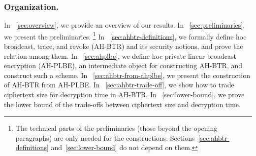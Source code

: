 \subsubsection{Organization.}
In \Section~\ref{sec:overview}, we provide an overview of our results.
In \Section~\ref{sec:preliminaries}, we present the preliminaries.%
\footnote{The technical parts of the preliminaries (those beyond the opening paragraphs) are only needed for the constructions.
Sections~\ref{sec:ahbtr-definitions} and~\ref{sec:lower-bound} do not depend on them.}
In \Section~\ref{sec:ahbtr-definitions}, we formally define \ad hoc broadcast, trace, and revoke (AH-BTR) and its security notions, and prove the relation among them.
In \Section~\ref{sec:ahplbe}, we define \ad hoc private linear broadcast encryption (AH-PLBE), an intermediate object for constructing AH-BTR, and construct such a scheme.
In \Section~\ref{sec:ahbtr-from-ahplbe}, we present the construction of AH-BTR from AH-PLBE.
In \Section~\ref{sec:ahbtr-trade-off}, we show how to trade ciphertext size for decryption time in AH-BTR.
In \Section~\ref{sec:lower-bound}, we prove the lower bound of the trade-offs between ciphertext size and decryption time.
